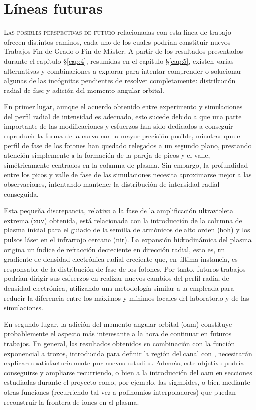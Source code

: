 \chapter{Líneas futuras}\label{cap:7}
\lettrine{L}{as posibles perspectivas de futuro} relacionadas con esta línea de trabajo ofrecen distintos caminos, cada uno de los cuales podrían constituir nuevos Trabajos Fin de Grado o Fin de Máster. A partir de los resultados presentados durante el capítulo \S\ref{cap:4}, resumidas en el capítulo \S\ref{cap:5}, existen varias alternativas y combinaciones a explorar para intentar comprender o solucionar algunas de las incógnitas pendientes de resolver completamente: distribución radial de fase y adición del momento angular orbital.

En primer lugar, aunque el acuerdo obtenido entre experimento y simulaciones del perfil radial de intensidad es adecuado, esto sucede debido a que una parte importante de las modificaciones y esfuerzos han sido dedicados a conseguir reproducir la forma de la curva con la mayor precisión posible, mientras que el perfil de fase de los fotones han quedado relegados a un segundo plano, prestando atención simplemente a la formación de la pareja de picos y el valle, simétricamente centrados en la columna de plasma. Sin embargo, la profundidad entre los picos y valle de fase de las simulaciones necesita aproximarse mejor a las observaciones, intentando mantener la distribución de intensidad radial conseguida.

Esta pequeña discrepancia, relativa a la fase de la amplificación ultravioleta extrema (\acrshort{xuv}) obtenida, está relacionada con la introducción de la columna de plasma inicial para el guiado de la semilla de armónicos de alto orden (\acrshort{hoh}) y los pulsos láser en el infrarrojo cercano (\acrshort{nir}). La expansión hidrodinámica del plasma origina un índice de refracción decreciente en dirección radial, esto es, un gradiente de densidad electrónica radial creciente que, en última instancia, es responsable de la distribución de fase de los fotones. Por tanto, futuros trabajos podrían dirigir sus esfuerzos en realizar nuevos cambios del perfil radial de densidad electrónica, utilizando una metodología similar a la empleada para reducir la diferencia entre los máximos y mínimos locales del laboratorio y de las simulaciones.

En segundo lugar, la adición del momento angular orbital (\acrshort{oam}) constituye probablemente el aspecto más interesante a la hora de continuar en futuros trabajos. En general, los resultados obtenidos en combinación con la función exponencial a trozos, introducida para definir la región del canal con , necesitarán explicarse satisfactoriamente por nuevos estudios. Además, este objetivo podría conseguirse y ampliarse recurriendo, o bien a la introducción del \acrshort{oam} en secciones estudiadas durante el proyecto como, por ejemplo, las sigmoides, o bien mediante otras funciones (recurriendo tal vez a polinomios interpoladores) que puedan reconstruir la frontera de iones  en el plasma.

